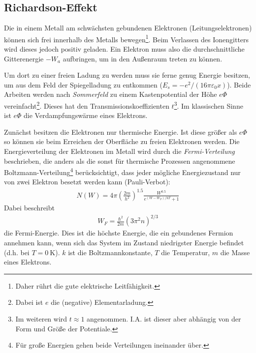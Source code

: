 \subsection{Richardson-Effekt}
\label{sub:richardson_effekt}
  Die in einem Metall am schwächsten gebundenen Elektronen (Leitungselektronen) können sich frei innerhalb des Metalls bewegen\footnote{Daher rührt die gute elektrische Leitfähigkeit.}. Beim Verlassen des Ionengitters wird dieses jedoch positiv geladen. Ein Elektron muss also die durchschnittliche Gitterenergie $-W_a$ aufbringen, um in den Außenraum treten zu können.
  \par
  Um dort zu einer freien Ladung zu werden muss sie ferne genug Energie besitzen, um aus dem Feld der Spiegelladung zu entkommen ($E_s = -e^2/(16 \pi \varepsilon_0 x)$). Beide Arbeiten werden nach \emph{Sommerfeld} zu einem Kastenpotential der Höhe $e \Phi$ vereinfacht\footnote{Dabei ist $e$ die (negative) Elementarladung.}. Dieses hat den Transmissionskoeffizienten $t$\footnote{Im weiteren wird $t\approx 1$ angenommen. I.A. ist dieser aber abhängig von der Form und Größe der Potentiale.}. Im klassischen Sinne ist $e \Phi$ die Verdampfungswärme eines Elektrons.

  Zunächst besitzen die Elektronen nur thermische Energie. Ist diese größer als $e\Phi$ so können sie beim Erreichen der Oberfläche zu freien Elektronen werden. Die Energieverteilung der Elektronen im Metall wird durch die \emph{Fermi-Verteilung} beschrieben, die anders als die sonst für thermische Prozessen angenommene Boltzmann-Verteilung\footnote{Für große Energien gehen beide Verteilungen ineinander über.} berücksichtigt, dass jeder mögliche Energiezustand nur von zwei Elektron besetzt werden kann (Pauli-Verbot):
  \begin{align}\label{equ:fermi}
    N(W) = 4\pi (\frac{2 m}{h^2})^{1.5} \frac{W^{0.5}}{e^{(W-W_F)/{kT}}+1}
  \end{align}
  Dabei beschreibt
  \begin{align}\label{equ:fermi_energy}
      W_F = \frac{\hbar^2}{2m} (3\pi^2 n)^{2/3}
   \end{align}
  die Fermi-Energie. Dies ist die höchste Energie, die ein gebundenes Fermion annehmen kann, wenn sich das System im Zustand niedrigster Energie befindet (d.h. bei $T=\SI{0}{\K}$). $k$ ist die Boltzmannkonstante, $T$ die Temperatur, $m$ die Masse eines Elektrons.
  \par

